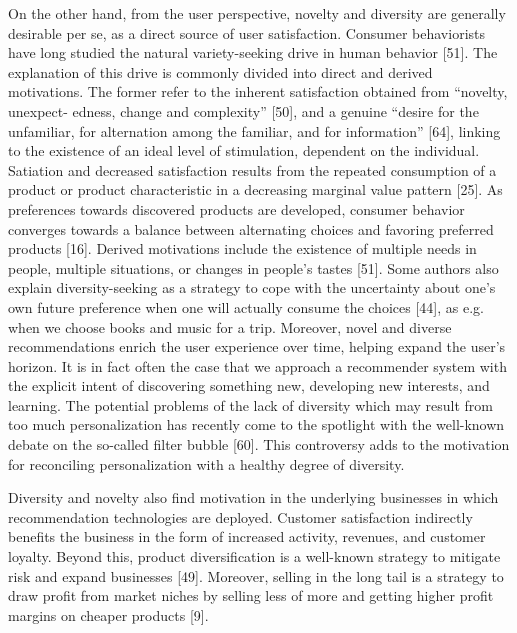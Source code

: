 On the other hand, from the user perspective, novelty and diversity are generally desirable per se, as a direct source of user satisfaction. Consumer behaviorists have long studied the natural variety-seeking drive in human behavior [51]. The explanation of this drive is commonly divided into direct and derived motivations. The former refer to the inherent satisfaction obtained from “novelty, unexpect- edness, change and complexity” [50], and a genuine “desire for the unfamiliar, for alternation among the familiar, and for information” [64], linking to the existence of an ideal level of stimulation, dependent on the individual. Satiation and decreased satisfaction results from the repeated consumption of a product or product characteristic in a decreasing marginal value pattern [25]. As preferences towards discovered products are developed, consumer behavior converges towards a balance between alternating choices and favoring preferred products [16]. Derived motivations include the existence of multiple needs in people, multiple situations, or changes in people’s tastes [51]. Some authors also explain diversity-seeking as a strategy to cope with the uncertainty about one’s own future preference when one will actually consume the choices [44], as e.g. when we choose books and music for a trip. Moreover, novel and diverse recommendations enrich the user experience over time, helping expand the user’s horizon. It is in fact often the case that we approach a recommender system with the explicit intent of discovering something new, developing new interests, and learning. The potential problems of the lack of diversity which may result from too much personalization has recently come to the spotlight with the well-known debate on the so-called filter bubble [60]. This controversy adds to the motivation for reconciling personalization with a healthy degree of diversity.

Diversity and novelty also find motivation in the underlying businesses in which recommendation technologies are deployed. Customer satisfaction indirectly benefits the business in the form of increased activity, revenues, and customer loyalty. Beyond this, product diversification is a well-known strategy to mitigate risk and expand businesses [49]. Moreover, selling in the long tail is a strategy to draw profit from market niches by selling less of more and getting higher profit margins on cheaper products [9].

